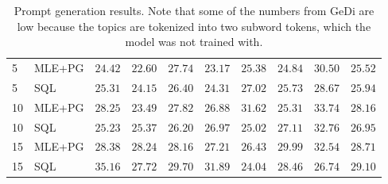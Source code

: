 \begin{table*}
\begin{tabular}{p{}l|p{}p{}p{}p{}p{}p{}p{}|>{\boldmath}l}
5 & MLE+PG   & $24.42$ & $22.60$ & $27.74$ & $23.17$ & $25.38$ & $24.84$ & $30.50$ & $25.52$ \\
5 & SQL      & $25.31$ & $24.15$ & $26.40$ & $24.31$ & $27.02$ & $25.73$ & $28.67$ & $25.94$ \\
10 & MLE+PG   & $28.25$ & $23.49$ & $27.82$ & $26.88$ & $31.62$ & $25.31$ & $33.74$ & $28.16$ \\
10 & SQL      & $25.23$ & $25.37$ & $26.20$ & $26.97$ & $25.02$ & $27.11$ & $32.76$ & $26.95$ \\
15 & MLE+PG   & $28.38$ & $28.24$ & $28.16$ & $27.21$ & $26.43$ & $29.99$ & $32.54$ & $28.71$ \\
15 & SQL      & $35.16$ & $27.72$ & $29.70$ & $31.89$ & $24.04$ & $28.46$ & $26.74$ & $29.10$ \\
\bottomrule
\end{tabular}
\caption{Prompt generation results. Note that some of the numbers from GeDi are low because the topics are tokenized into two subword tokens, which the model was not trained with. 
}
\label{table:prompt-generation-full}
\end{table*}











